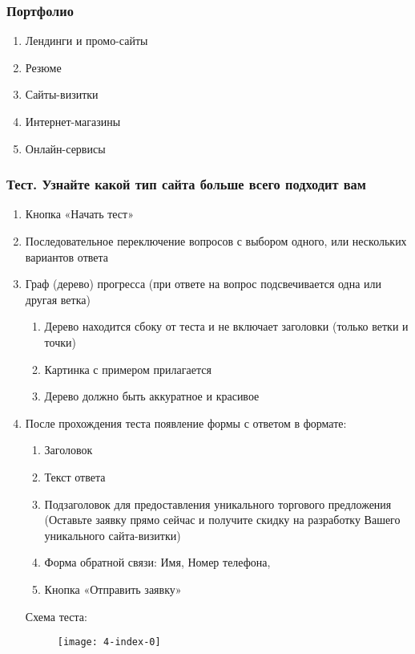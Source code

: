 \subsubsection{Портфолио}
\begin{enumerate}
  \item Лендинги и промо-сайты
  \item Резюме
  \item Сайты-визитки
  \item Интернет-магазины
  \item Онлайн-сервисы
\end{enumerate}

\subsubsection{Тест. Узнайте какой тип сайта больше всего подходит вам}
\begin{enumerate}
  \item Кнопка «Начать тест»
  \item Последовательное переключение вопросов с выбором одного, или нескольких вариантов ответа
  \item Граф (дерево) прогресса (при ответе на вопрос подсвечивается одна или другая ветка)
  \begin{enumerate}
    \item Дерево находится сбоку от теста и не включает заголовки (только ветки и точки)
    \item Картинка с примером прилагается
    \item Дерево должно быть аккуратное и красивое
  \end{enumerate}
  \item После прохождения теста появление формы с ответом в формате:
  \begin{enumerate}
    \item Заголовок
    \item Текст ответа
    \item Подзаголовок для предоставления уникального торгового предложения (Оставьте заявку прямо сейчас и получите скидку на разработку Вашего уникального сайта-визитки)
    \item Форма обратной связи: Имя, Номер телефона,
    \item Кнопка «Отправить заявку»
  \end{enumerate}
  Схема теста:
  \begin{figure}[H]
    \texttt{[image: 4-index-0]}
  \end{figure}
\end{enumerate}
